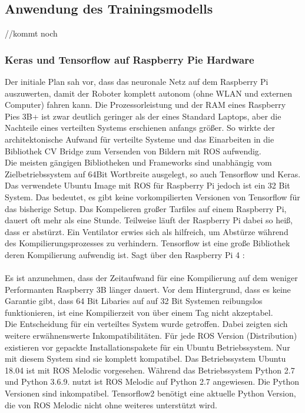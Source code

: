\documentclass[conference]{IEEEtran}
\begin{document}
\subsection{Anwendung des Trainingsmodells} %
//kommt noch
\subsubsection{Keras und Tensorflow auf Raspberry Pie Hardware}
Der initiale Plan sah vor, dass das neuronale Netz auf dem Raspberry Pi auszuwerten, damit der Roboter komplett autonom (ohne WLAN und externen Computer) fahren kann. Die Prozessorleistung und der RAM eines Raspberry Pies 3B+ ist zwar deutlich geringer als der eines Standard Laptops, aber die Nachteile eines verteilten Systems erschienen anfangs größer. So wirkte der architektonische Aufwand für  verteilte Systeme und  das Einarbeiten in die Bibliothek CV Bridge zum Versenden von Bildern mit ROS aufwendig. \\
Die meisten gängigen Bibliotheken und Frameworks sind unabhängig vom Zielbetriebssystem auf 64Bit Wortbreite ausgelegt, so auch Tensorflow und Keras.  Das verwendete Ubuntu Image mit ROS für Raspberry Pi jedoch ist ein 32 Bit System. Das bedeutet, es gibt keine vorkompilierten Versionen von Tensorflow für das bisherige Setup. Das Kompelieren großer Tarfiles auf einem Raspberry Pi, dauert oft mehr als eine Stunde. Teilweise läuft der Raspberry Pi dabei so heiß, dass er abstürzt. Ein Ventilator erwies sich als hilfreich, um  Abstürze während des Kompilierungsprozesses zu verhindern. Tensorflow ist eine große Bibliothek deren Kompilierung aufwendig ist. 
Sagt über den Raspberry Pi 4   : \\
 \\
Es ist  anzunehmen, dass der Zeitaufwand für eine Kompilierung auf dem weniger Performanten Raspberry 3B länger dauert. Vor dem Hintergrund, dass es keine Garantie gibt, dass 64 Bit Libaries auf auf 32 Bit Systemen reibungslos funktionieren, ist eine Kompilierzeit von über einem Tag nicht akzeptabel. \\

Die Entscheidung für ein verteiltes System wurde getroffen. Dabei zeigten sich weitere erwähnenswerte Inkompatibilitäten. Für jede ROS Version (Distribution) existieren vor gepackte Installationspakete für ein Ubuntu Betriebssystem. Nur mit diesem System sind sie komplett kompatibel. Das Betriebssystem Ubuntu 18.04 ist mit ROS Melodic vorgesehen. Während das Betriebssystem Python 2.7 und Python 3.6.9. nutzt ist ROS Melodic auf Python 2.7 angewiesen. Die Python Versionen sind inkompatibel. Tensorflow2 benötigt eine aktuelle Python Version, die von ROS Melodic nicht ohne weiteres unterstützt wird. \\
\end{document}
